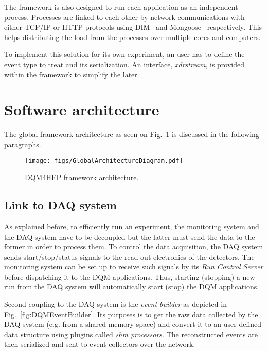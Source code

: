 \documentclass[journal]{IEEEtran}
\begin{document}
The framework is also designed to run each application as an independent process. Processes are linked to each other by network communications with either TCP/IP or HTTP protocols using DIM~\cite{DIM} and Mongoose~\cite{MONGOOSE} respectively. This helps distributing the load from the processes over multiple cores and computers.

To implement this solution for its own experiment, an user has to define the event type to treat and its serialization. An interface, \textit{xdrstream}, is provided within the framework to simplify the later.

\section{Software architecture}

The global framework architecture as seen on Fig.~\ref{fig:DQM4HEPArchitecture} is discussed in the following paragraphs.
\begin{figure}[htbp]
  \begin{center}
    \texttt{[image: figs/GlobalArchitectureDiagram.pdf]}
    \caption{\label{fig:DQM4HEPArchitecture} DQM4HEP framework architecture.}
  \end{center}
\end{figure}


\subsection{Link to DAQ system}
As explained before, to efficiently run an experiment, the monitoring system and the DAQ system have to be decoupled but the latter must send the data to the former in order to process them. To control the data acquisition, the DAQ system sends start/stop/status signals to the read out electronics of the detectors. The monitoring system can be set up to receive such signals by
its \textit{Run Control Server} before dispatching it to the DQM applications. Thus, starting (stopping) a new run from the DAQ system will automatically start (stop) the DQM applications.

Second coupling to the DAQ system is the \textit{event builder} as depicted in Fig.~\ref{fig:DQMEventBuilder}. Its purposes is to get the raw data collected by the DAQ system (e.g. from a shared memory space) and convert it to an user defined data structure using plugins called \textit{shm processors}. The reconstructed events are then serialized and sent to event collectors over the network.
\end{document}
